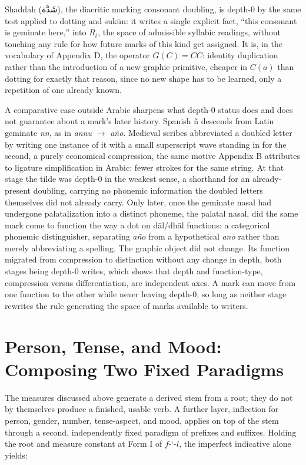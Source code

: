 \documentclass[11pt]{article}
\newcommand{\ar}[1]{\textarabic{#1}}
\begin{document}
Shaddah (\ar{شَدَّة}), the diacritic marking consonant doubling, is depth-0 by the same
test applied to dotting and sukūn: it writes a single explicit fact,
\textquotedblleft this consonant is geminate here,\textquotedblright{} into
$R_t$, the space of admissible syllabic readings, without touching any rule
for how future marks of this kind get assigned. It is, in the vocabulary of
Appendix D, the operator $G(C) = CC$: identity duplication rather than the
introduction of a new graphic primitive, cheaper in $C(a)$ than dotting for
exactly that reason, since no new shape has to be learned, only a
repetition of one already known.

A comparative case outside Arabic sharpens what depth-0 status does and
does not guarantee about a mark's later history. Spanish \~{n} descends from
Latin geminate \emph{nn}, as in \emph{annu} $\to$ \emph{a\~{n}o}. Medieval
scribes abbreviated a doubled letter by writing one instance of it with a
small superscript wave standing in for the second, a purely economical
compression, the same motive Appendix B attributes to ligature simplification
in Arabic: fewer strokes for the same string. At that stage the tilde was
depth-0 in the weakest sense, a shorthand for an already-present doubling,
carrying no phonemic information the doubled letters themselves did not
already carry. Only later, once the geminate nasal had undergone
palatalization into a distinct phoneme, the palatal nasal, did the same mark come
to function the way a dot on d\=al/dh\=al functions: a categorical phonemic
distinguisher, separating \emph{a\~{n}o} from a hypothetical \emph{ano}
rather than merely abbreviating a spelling. The graphic object did not
change. Its function migrated from compression to distinction without any
change in depth, both stages being depth-0 writes, which shows that depth
and function-type, compression versus differentiation, are independent
axes. A mark can move from one function to the other while never leaving
depth-0, so long as neither stage rewrites the rule generating the space of
marks available to writers.

\section{Person, Tense, and Mood: Composing Two Fixed Paradigms}

The measures discussed above generate a derived stem from a root; they do
not by themselves produce a finished, usable verb. A further layer,
inflection for person, gender, number, tense-aspect, and mood, applies on
top of the stem through a second, independently fixed paradigm of prefixes
and suffixes. Holding the root and measure constant at Form I of
$f$-`-$l$, the imperfect indicative alone yields:
\end{document}
